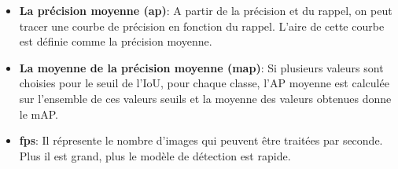 \begin{itemize}
                \item \textbf{La précision moyenne (\acrshort{ap})}: A partir de la précision et du rappel, on peut tracer une courbe de précision en fonction du rappel.  L’aire de cette courbe est définie comme la précision moyenne.
            
                \item \textbf{La moyenne de la précision moyenne (\acrshort{map})}:  Si plusieurs valeurs sont choisies pour le seuil de l'IoU, pour chaque classe, l'AP moyenne est calculée sur l'ensemble de ces valeurs seuils et la moyenne des valeurs obtenues donne le mAP. \cite{makina}
                \item \textbf{\acrfull{fps}}: Il répresente le nombre d'images qui peuvent être traitées par seconde. Plus il est grand, plus le modèle de détection est rapide.
            \end{itemize}
    
